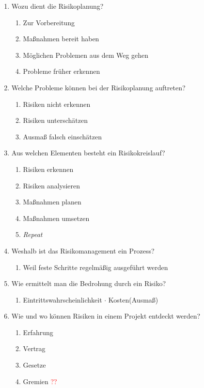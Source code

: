 \documentclass[12pt,a4paper]{article}
\begin{document}
\begin{enumerate}
\begin{enumerate}
	\end{enumerate}
	\item Wozu dient die Risikoplanung?
	\begin{enumerate}
		\item Zur Vorbereitung
		\item Maßnahmen bereit haben
		\item Möglichen Problemen aus dem Weg gehen
		\item Probleme früher erkennen
	\end{enumerate}
	\item Welche Probleme können bei der Risikoplanung auftreten?
	\begin{enumerate}
		\item Risiken nicht erkennen
		\item Risiken unterschätzen
		\item Ausmaß falsch einschätzen
	\end{enumerate}
	\item Aus welchen Elementen besteht ein Risikokreislauf?
	\begin{enumerate}
		\item Risiken erkennen
		\item Risiken analysieren
		\item Maßnahmen planen 
		\item Maßnahmen umsetzen
		\item \textit{Repeat}
	\end{enumerate}
	\item Weshalb ist das Risikomanagement ein Prozess?
	\begin{enumerate}
		\item Weil feste Schritte regelmäßig ausgeführt werden
	\end{enumerate}
	\item Wie ermittelt man die Bedrohung durch ein Risiko?
	\begin{enumerate}
		\item Eintrittswahrscheinlichkeit $\cdot$ Kosten(Ausmaß)
	\end{enumerate}
	\item Wie und wo können Risiken in einem Projekt entdeckt werden?
	\begin{enumerate}
		\item Erfahrung
		\item Vertrag
		\item Gesetze
		\item Gremien \textcolor{red}{??}
	\end{enumerate}

\end{enumerate}
\end{document}
